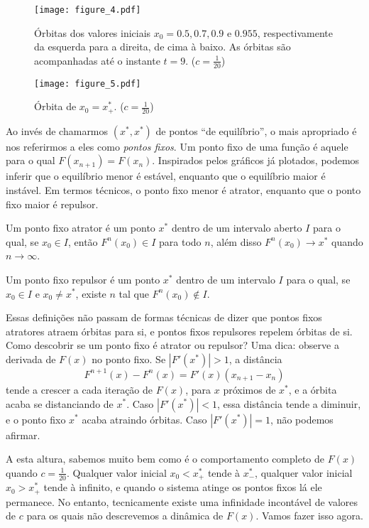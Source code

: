 \documentclass{article}
\newenvironment{definition}[1][Definição]{\begin{trivlist}
\item[\hskip \labelsep {\bfseries #1}]}{\end{trivlist}}
\begin{document}
\begin{figure}[hbtp]
\centering
\texttt{[image: figure\_4.pdf]}
\caption{Órbitas dos valores iniciais $x_0 = 0.5, 0.7, 0.9 \textrm{ e } 0.955$, respectivamente da esquerda para a direita, de cima à baixo. As órbitas são acompanhadas até o instante $t = 9$. ($c = \frac{1}{20}$)}
\label{fig3}
\end{figure}

\begin{figure}[hbtp]
\centering
\texttt{[image: figure\_5.pdf]}
\caption{Órbita de $x_0 = x^*_+$. ($c = \frac{1}{20}$)}
\label{fig4}
\end{figure}

Ao invés de chamarmos $(x^*,x^*)$ de pontos ``de equilíbrio'', o mais apropriado é nos referirmos a eles como \emph{pontos fixos}. Um ponto fixo de uma função é aquele para o qual $F(x_{n+1}) = F(x_n)$. Inspirados pelos gráficos já plotados, podemos inferir que o equilíbrio menor é estável, enquanto que o equilíbrio maior é instável. Em termos técnicos, o ponto fixo menor é atrator, enquanto que o ponto fixo maior é repulsor. 

\begin{definition}
Um ponto fixo atrator é um ponto $x^*$ dentro de um intervalo aberto $I$ para o qual, se $x_0 \in I$, então $F^n(x_0) \in I$ para todo $n$, além disso $F^n(x_0) \rightarrow x^*$ quando $n \rightarrow \infty $.
\end{definition}
\begin{definition}
Um ponto fixo repulsor é um ponto $x^*$ dentro de um intervalo $I$ para o qual, se $x_0 \in I$ e $x_0 \neq x^*$, existe $n$ tal que $F^n(x_0) \not\in I$.
\end{definition}

Essas definições não passam de formas técnicas de dizer que pontos fixos atratores atraem órbitas para si, e pontos fixos repulsores repelem órbitas de si. Como descobrir se um ponto fixo é atrator ou repulsor? Uma dica: observe a derivada de $F(x)$ no ponto fixo. Se $|F'(x^*)| > 1$, a distância \[
F^{n+1}(x) - F^n(x) = F'(x)(x_{n+1} - x_n)
\] tende a crescer a cada iteração de $F(x)$, para $x$ próximos de $x^*$, e a órbita acaba se distanciando de $x^*$. Caso $|F'(x^*)| < 1$, essa distância tende a diminuir, e o ponto fixo $x^*$ acaba atraindo órbitas. Caso $|F'(x^*)| = 1$, não podemos afirmar.

A esta altura, sabemos muito bem como é o comportamento completo de $F(x)$ quando $c = \frac{1}{20}$. Qualquer valor inicial $x_0 < x^*_+$ tende à $x^*_-$, qualquer valor inicial $x_0 > x^*_+$ tende à infinito, e quando o sistema atinge os pontos fixos lá ele permanece. No entanto, tecnicamente existe uma infinidade incontável de valores de $c$ para os quais não descrevemos a dinâmica de $F(x)$. Vamos fazer isso agora.
\end{document}
